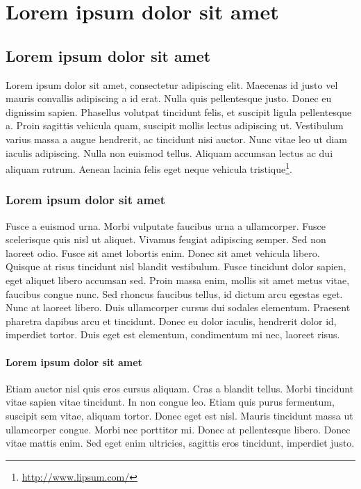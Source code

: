 \chapter{Lorem ipsum dolor sit amet}\label{chp:LABEL_CHP_1}

\section{Lorem ipsum dolor sit amet}\label{sec:LABEL_CHP_1_SEC_A}
Lorem ipsum dolor sit amet, consectetur adipiscing elit. Maecenas id justo vel mauris convallis adipiscing a id erat. Nulla quis pellentesque justo. Donec eu dignissim sapien. Phasellus volutpat tincidunt felis, et suscipit ligula pellentesque a. Proin sagittis vehicula quam, suscipit mollis lectus adipiscing ut. Vestibulum varius massa a augue hendrerit, ac tincidunt nisi auctor. Nunc vitae leo ut diam iaculis adipiscing. Nulla non euismod tellus. Aliquam accumsan lectus ac dui aliquam rutrum. Aenean lacinia felis eget neque vehicula tristique\footnote{\url{http://www.lipsum.com/}}.

\subsection{Lorem ipsum dolor sit amet}\label{sec:LABEL_CHP_1_SEC_B}
Fusce a euismod urna. Morbi vulputate faucibus urna a ullamcorper. Fusce scelerisque quis nisl ut aliquet. Vivamus feugiat adipiscing semper. Sed non laoreet odio. Fusce sit amet lobortis enim. Donec sit amet vehicula libero. Quisque at risus tincidunt nisl blandit vestibulum. Fusce tincidunt dolor sapien, eget aliquet libero accumsan sed. Proin massa enim, mollis sit amet metus vitae, faucibus congue nunc. Sed rhoncus faucibus tellus, id dictum arcu egestas eget. Nunc at laoreet libero. Duis ullamcorper cursus dui sodales elementum. Praesent pharetra dapibus arcu et tincidunt. Donec eu dolor iaculis, hendrerit dolor id, imperdiet tortor. Duis eget est elementum, condimentum mi nec, laoreet risus.

\subsubsection{Lorem ipsum dolor sit amet}\label{sec:LABEL_CHP_1_SEC_C}
Etiam auctor nisl quis eros cursus aliquam. Cras a blandit tellus. Morbi tincidunt vitae sapien vitae tincidunt. In non congue leo. Etiam quis purus fermentum, suscipit sem vitae, aliquam tortor. Donec eget est nisl. Mauris tincidunt massa ut ullamcorper congue. Morbi nec porttitor mi. Donec at pellentesque libero. Donec vitae mattis enim. Sed eget enim ultricies, sagittis eros tincidunt, imperdiet justo.


